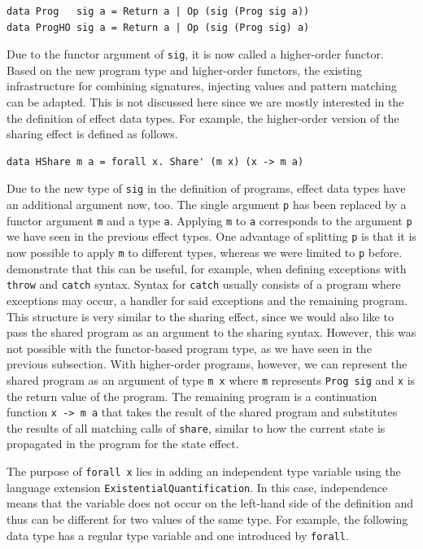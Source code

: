 \documentclass[a4paper, 11pt, fleqn, twoside, abstract=on]{scrreprt}
\newcommand{\hinl}[1]{\texttt{#1}}
\begin{document}
\begin{verbatim}
data Prog   sig a = Return a | Op (sig (Prog sig a))
data ProgHO sig a = Return a | Op (sig (Prog sig) a)
\end{verbatim}

Due to the functor argument of \hinl{sig}, it is now called a higher-order functor.
Based on the new program type and higher-order functors, the existing infrastructure for combining signatures, injecting values and pattern matching can be adapted.
This is not discussed here since we are mostly interested in the the definition of effect data types.
For example, the higher-order version of the sharing effect is defined as follows.

\begin{verbatim}
data HShare m a = forall x. Share' (m x) (x -> m a)
\end{verbatim}

Due to the new type of \hinl{sig} in the definition of programs, effect data types have an additional argument now, too.
The single argument \hinl{p} has been replaced by a functor argument \hinl{m} and a type \hinl{a}.
Applying \hinl{m} to \hinl{a} corresponds to the argument \hinl{p} we have seen in the previous effect types.
One advantage of splitting \hinl{p} is that it is now possible to apply \hinl{m} to different types, whereas we were limited to \hinl{p} before.
\citet{wu2014effect} demonstrate that this can be useful, for example, when defining exceptions with \hinl{throw} and \hinl{catch} syntax.
Syntax for \hinl{catch} usually consists of a program where exceptions may occur, a handler for said exceptions and the remaining program.
This structure is very similar to the sharing effect, since we would also like to pass the shared program as an argument to the sharing syntax.
However, this was not possible with the functor-based program type, as we have seen in the previous subsection.
With higher-order programs, however, we can represent the shared program as an argument of type \hinl{m x} where \hinl{m} represents \hinl{Prog sig} and \hinl{x} is the return value of the program.
The remaining program is a continuation function \hinl{x -> m a} that takes the result of the shared program and substitutes the results of all matching calls of \hinl{share}, similar to how the current state is propagated in the program for the state effect.

The purpose of \hinl{forall x} lies in adding an independent type variable using the language extension \hinl{ExistentialQuantification}.
In this case, independence means that the variable does not occur on the left-hand side of the definition and thus can be different for two values of the same type.
For example, the following data type has a regular type variable and one introduced by \hinl{forall}.
\end{document}
